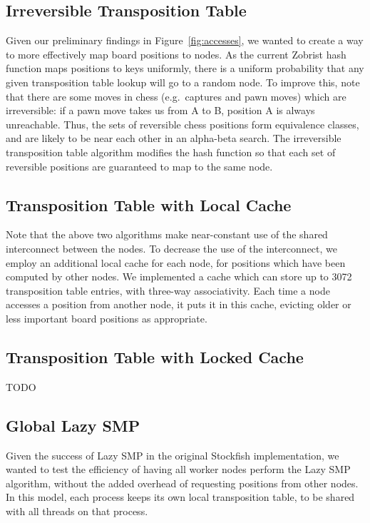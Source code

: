 \documentclass{article}
\begin{document}
\subsection{Irreversible Transposition Table}
Given our preliminary findings in Figure~\ref{fig:accesses}, we wanted to
create a way to more effectively map board positions to nodes. As the current
Zobrist hash function maps positions to keys uniformly, there is a uniform
probability that any given transposition table lookup will go to a random node.
To improve this, note that there are some moves in chess (e.g.\ captures and pawn
moves) which are irreversible: if a pawn move takes us from A to B, position A
is always unreachable. Thus, the sets of reversible chess positions form
equivalence classes, and are likely to be near each other in an alpha-beta
search. The irreversible transposition table algorithm modifies the hash
function so that each set of reversible positions are guaranteed to map to the
same node.

\subsection{Transposition Table with Local Cache}
Note that the above two algorithms make near-constant use of the shared
interconnect between the nodes. To decrease the use of the interconnect, we
employ an additional local cache for each node, for positions which have been
computed by other nodes. We implemented a cache which can store up to 3072
transposition table entries, with three-way associativity. Each time a node
accesses a position from another node, it puts it in this cache, evicting older
or less important board positions as appropriate.

\subsection{Transposition Table with Locked Cache}
TODO

\subsection{Global Lazy SMP}
Given the success of Lazy SMP in the original Stockfish implementation, we
wanted to test the efficiency of having all worker nodes perform the Lazy SMP
algorithm, without the added overhead of requesting positions from other nodes.
In this model, each process keeps its own local transposition table, to be
shared with all threads on that process.
\end{document}
